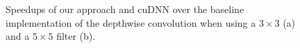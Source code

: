 \begin{figure}
\centering
	

\vspace{-2mm} \caption{Speedups of our approach and cuDNN over the baseline implementation of the depthwise convolution when using a
$3\times 3$ (a) and a $5\times 5$ filter (b).} \label{fig:dwruntime}
\vspace{-2mm}
\end{figure}


